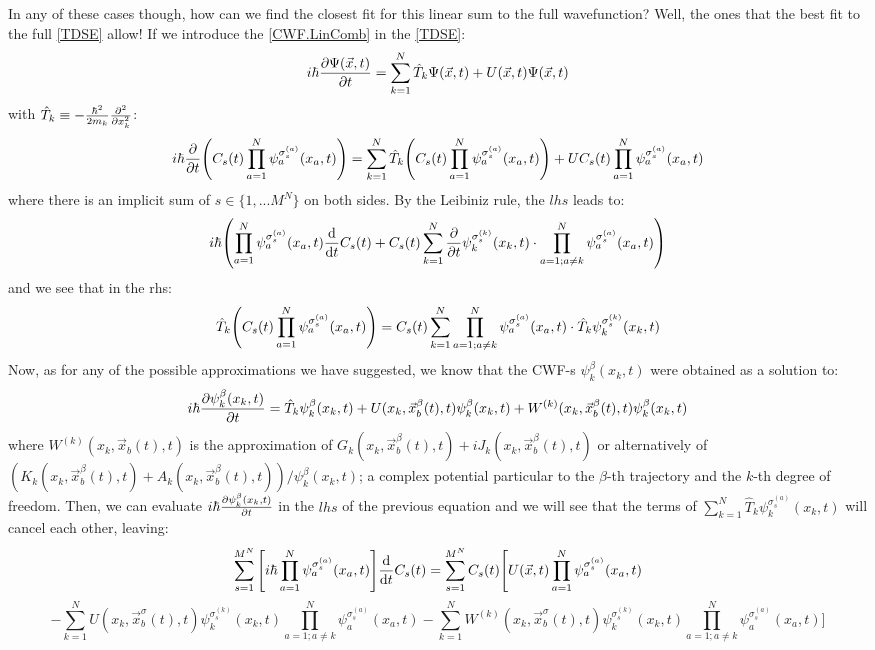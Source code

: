 \documentclass[11pt, a4paper]{article} %
\begin{document}
In any of these cases though, how can we find the closest fit for this linear sum to the full wavefunction? Well, the ones that the best fit to the full \ref{TDSE} allow! If we introduce the \ref{CWF.LinComb} in the \ref{TDSE}:
$$
i\hbar \pdv{\Psi(\vec{x},t)}{t} = \sum_{k=1}^N \hat{T}_k\Psi(\vec{x},t)+U(\vec{x},t)\Psi(\vec{x},t)
$$
with $\hat{T}_k\equiv -\frac{\hbar^2}{2m_k}\pdv[2]{}{x_k}$:
$$
i\hbar \pdv{}{t} \qty(C_s(t)\prod_{a=1}^N \psi_a^{\sigma_s^{(a)}}(x_a,t)) =  \sum_{k=1}^N \hat{T}_k\qty(C_s(t)\prod_{a=1}^N \psi_a^{\sigma_s^{(a)}}(x_a,t))+UC_s(t)\prod_{a=1}^N \psi_a^{\sigma_s^{(a)}}(x_a,t)
$$
where there is an implicit sum of $s\in \{1,...M^N\}$ on both sides. By the Leibiniz rule, the $lhs$ leads to:
$$
i\hbar \qty(\prod_{a=1}^N \psi_a^{\sigma_s^{(a)}}(x_a,t)\dv{}{t}C_s(t)+C_s(t)\sum_{k=1}^N \pdv{}{t}\psi_k^{\sigma_s^{(k)}}(x_k,t)\cdot \prod_{a=1;a\neq k}^N \psi_a^{\sigma_s^{(a)}}(x_a,t) )
$$
and we see that in the rhs:
$$
\hat{T}_k\qty(C_s(t)\prod_{a=1}^N \psi_a^{\sigma_s^{(a)}}(x_a,t)) = C_s(t)\sum_{k=1}^N \prod_{a=1;a\neq k}^N  \psi_a^{\sigma_s^{(a)}}(x_a,t)  \cdot \hat{T}_k \psi_k^{\sigma_s^{(k)}}(x_k,t) 
$$
Now, as for any of the possible approximations we have suggested, we know that the CWF-s $\psi^\beta_k(x_k,t)$ were obtained as a solution to:
$$
i\hbar \pdv{\psi^\beta_k(x_k,t)}{t} = \hat{T}_k\psi^\beta_k(x_k,t) + U(x_k, \vec{x}^\beta_b(t), t)\psi^\beta_k(x_k,t) + W^{(k)}(x_k, \vec{x}^\beta_{b}(t),t) \psi^\beta_k(x_k,t)
$$
where $ W^{(k)}(x_k, \vec{x}_{b}(t),t)$ is the approximation of $G_k(x_k,\vec{x}^\beta_b(t),t)+iJ_k(x_k,\vec{x}^\beta_b(t),t)$ or alternatively of $(K_k(x_k,\vec{x}^\beta_b(t),t)+A_k(x_k,\vec{x}^\beta_b(t),t))/\psi^\beta_k(x_k,t)$; a complex potential particular to the $\beta$-th trajectory and the $k$-th degree of freedom. Then, we can evaluate $i\hbar \pdv{\psi^\beta_k(x_k,t)}{t}$ in the $lhs$ of the previous equation and we will see that the terms of $\sum_{k=1}^N \hat{T}_k \psi^{\sigma_s^{(a)}}_k(x_k,t)$ will cancel each other, leaving:
$$
\sum_{s=1}^{M^N} \qty[i\hbar \prod_{a=1}^N  \psi_a^{\sigma_s^{(a)}}(x_a,t)] \dv{}{t}C_s(t) = \sum_{s=1}^{M^N}C_s(t) \Bigg[ U(\vec{x},t)\prod_{a=1}^N  \psi_a^{\sigma_s^{(a)}}(x_a,t) 
$$
$$
- \sum_{k=1}^N U(x_k,\vec{x}_b^{\sigma}(t),t)\psi_k^{\sigma_s^{(k)}}(x_k,t) \prod_{a=1; a\neq k}^N  \psi_a^{\sigma_s^{(a)}}(x_a,t) -\sum_{k=1}^N W^{(k)}(x_k,\vec{x}_b^{\sigma}(t),t)\psi_k^{\sigma_s^{(k)}}(x_k,t) \prod_{a=1; a\neq k}^N  \psi_a^{\sigma_s^{(a)}}(x_a,t)\Bigg]
$$
\end{document}
